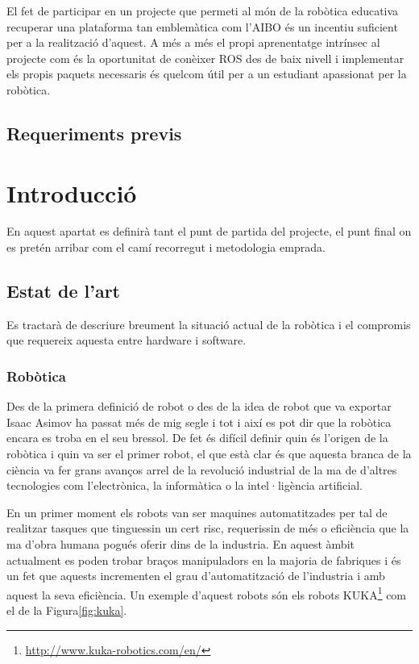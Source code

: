 \documentclass[12pt,a4paper,final,twoside]{article}
\begin{document}
El fet de participar en un projecte que permeti al món de la robòtica educativa recuperar una plataforma tan emblemàtica com l'AIBO és un incentiu suficient per a la realització d'aquest. 
A més a més el propi aprenentatge intrínsec al projecte com és la oportunitat de conèixer ROS des de baix nivell i implementar els propis paquets necessaris és quelcom útil per a un estudiant apassionat per la robòtica. 

 

\subsection{Requeriments previs}
\section{Introducció}
En aquest apartat es definirà tant el punt de partida del projecte, el punt final on es pretén arribar com el camí recorregut i metodologia emprada. 
\subsection{Estat de l'art}
\label{estatdelart}
Es tractarà de descriure breument la situació actual de la robòtica i el compromis que requereix aquesta entre hardware i software.
\subsubsection{Robòtica}
Des de la primera definició de robot o des de la idea de robot que va exportar Isaac Asimov ha passat més de mig segle i tot i així es pot dir que la robòtica encara es troba en el seu bressol. De fet és difícil definir quin és l'origen de la robòtica i quin va ser el primer robot, el que està clar és que aquesta branca de la ciència va fer grans avanços arrel de la revolució industrial de la ma de d'altres tecnologies com l'electrònica, la informàtica o la intel·ligència artificial.

En un primer moment els robots van ser maquines automatitzades per tal de realitzar tasques que tinguessin un cert risc, requerissin de més  o eficiència que la ma d'obra humana pogués oferir dins de la industria. En aquest àmbit actualment es poden trobar braços manipuladors en la majoria de fabriques i és un fet que aquests incrementen el grau d'automatització de l'industria i amb aquest la seva eficiència\cite{libroblanco}. Un exemple d'aquest robots són els robots KUKA\footnote{\url{http://www.kuka-robotics.com/en/}} com el de la Figura\ref{fig:kuka}.
 
\end{document}
